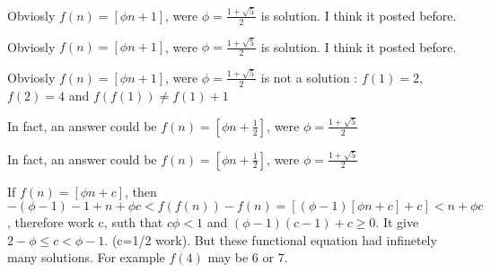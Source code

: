\begin{mysolution}
	Obviosly $ f(n)=[\phi n+1]$, were $ \phi =\frac{1+\sqrt 5 }{2}$ is solution.
I think it posted before.
\end{mysolution}



\begin{mysolution}
	\begin{tcolorbox}Obviosly $ f(n)=[\phi n+1]$, were $ \phi =\frac{1+\sqrt 5 }{2}$ is solution.
I think it posted before.\end{tcolorbox}

Obviosly $ f(n)=[\phi n+1]$, were $ \phi =\frac{1+\sqrt 5 }{2}$ is not a solution : $ f(1)=2$, $ f(2)=4$ and $ f(f(1))\neq f(1)+1$

In fact, an answer could be $ f(n)=[\phi n+\frac{1}{2}]$, were $ \phi =\frac{1+\sqrt 5 }{2}$
\end{mysolution}



\begin{mysolution}
	\begin{tcolorbox}In fact, an answer could be $ f(n)=[\phi n+\frac{1}{2}]$, were $ \phi =\frac{1+\sqrt 5 }{2}$\end{tcolorbox}
If $ f(n)=[\phi n+c]$, then $ -(\phi-1)-1+n+\phi c<f(f(n))-f(n)=[(\phi-1)[\phi n+c]+c]<n+\phi c$,
 therefore work c, suth that $ c\phi <1$ and $ (\phi-1)(c-1)+c\ge 0$. It give $ 2-\phi\le c<\phi-1$. (c=1/2 work).
But these functional equation had infinetely many solutions. For example $ f(4)$ may be 6 or 7.
\end{mysolution}



